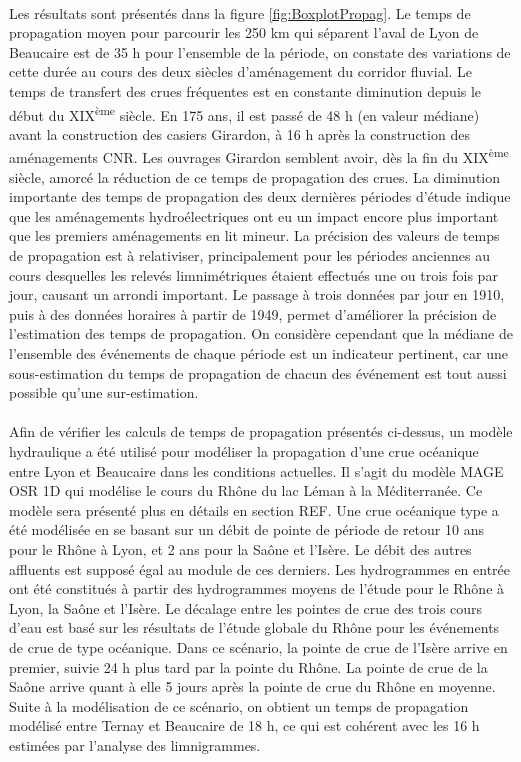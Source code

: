 \documentclass[11pt]{article}
\begin{document}
	\paragraph{} Les résultats sont présentés dans la figure \ref{fig:BoxplotPropag}. Le temps de propagation moyen pour parcourir les 250 km qui séparent l'aval de Lyon de Beaucaire est de 35 h pour l'ensemble de la période, on constate des variations de cette durée au cours des deux siècles d'aménagement du corridor fluvial. Le temps de transfert des crues fréquentes est en constante diminution depuis le début du XIX\textsuperscript{ème} siècle. En 175 ans, il est passé de 48 h (en valeur médiane) avant la construction des casiers Girardon, à 16 h après la construction des aménagements CNR. Les ouvrages Girardon semblent avoir, dès la fin du XIX\textsuperscript{ème} siècle, amorcé la réduction de ce temps de propagation des crues. La diminution importante des temps de propagation des deux dernières périodes d'étude indique que les aménagements hydroélectriques ont eu un impact encore plus important que les premiers aménagements en lit mineur. La précision des valeurs de temps de propagation est à relativiser, principalement pour les périodes anciennes au cours desquelles les relevés limnimétriques étaient effectués une ou trois fois par jour, causant un arrondi important. Le passage à trois données par jour en 1910, puis à des données horaires à partir de 1949, permet d'améliorer la précision de l'estimation des temps de propagation. On considère cependant que la médiane de l'ensemble des événements de chaque période est un indicateur pertinent, car une sous-estimation du temps de propagation de chacun des événement est tout aussi possible qu'une sur-estimation. 
	
	\paragraph{} Afin de vérifier les calculs de temps de propagation présentés ci-dessus, un modèle hydraulique a été utilisé pour modéliser la propagation d'une crue océanique entre Lyon et Beaucaire dans les conditions actuelles. Il s'agit du modèle MAGE OSR 1D qui modélise le cours du Rhône du lac Léman à la Méditerranée. Ce modèle sera présenté plus en détails en section REF. Une crue océanique type a été modélisée en se basant sur un débit de pointe de période de retour 10 ans pour le Rhône à Lyon, et 2 ans pour la Saône et l'Isère. Le débit des autres affluents est supposé égal au module de ces derniers. Les hydrogrammes en entrée ont été constitués à partir des hydrogrammes moyens de l'étude \citet{bard_actualisation_2018} pour le Rhône à Lyon, la Saône et l'Isère. Le décalage entre les pointes de crue des trois cours d'eau est basé sur les résultats de l'étude globale du Rhône \citep{rigaudiere_etude_2000} pour les événements de crue de type océanique. Dans ce scénario, la pointe de crue de l'Isère arrive en premier, suivie 24 h plus tard par la pointe du Rhône. La pointe de crue de la Saône arrive quant à elle 5 jours après la pointe de crue du Rhône en moyenne. Suite à la modélisation de ce scénario, on obtient un temps de propagation modélisé entre Ternay et Beaucaire de 18 h, ce qui est cohérent avec les 16 h estimées par l'analyse des limnigrammes. 
\end{document}
